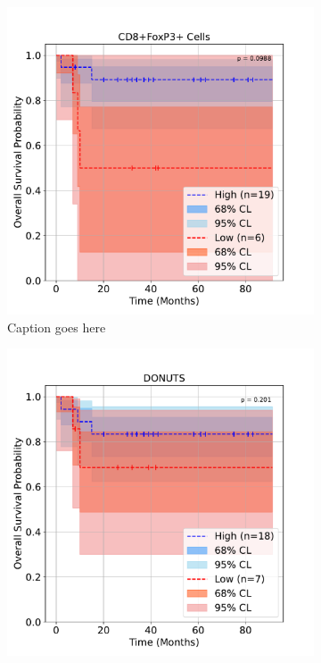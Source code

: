\documentclass[article]{jss}
\begin{document}
\begin{figure}
  \centering
  \begin{subfigure}[t]{0.49\textwidth}
    \centering
    \includegraphics[width=\linewidth]{lung_cells_km_OS.pdf}
    \caption{\label{fig:lung-dataset-cells} Caption goes here}
  \end{subfigure}
  \begin{subfigure}[t]{0.49\textwidth}
    \centering
    \includegraphics[width=\linewidth]{lung_donuts_km_OS.pdf}

\end{subfigure}
\end{figure}
\end{document}
